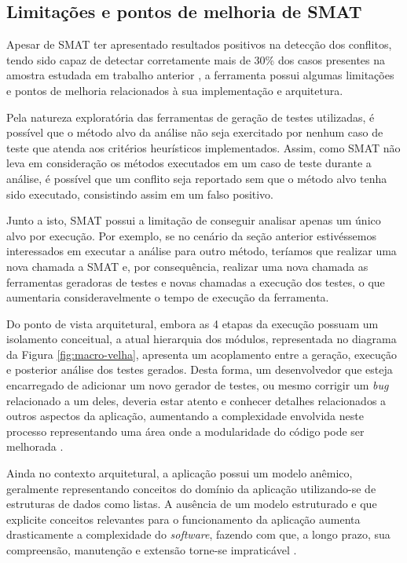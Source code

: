 \documentclass[12pt]{article}
\begin{document}
\subsection{Limitações e pontos de melhoria de SMAT}
Apesar de SMAT ter apresentado resultados positivos na detecção dos conflitos, tendo sido capaz de detectar corretamente mais de 30\% dos casos presentes na amostra estudada em trabalho anterior \cite{leuson:icsme}, a ferramenta possui algumas limitações e pontos de melhoria relacionados à sua implementação e arquitetura.

Pela natureza exploratória das ferramentas de geração de testes utilizadas, é possível que o método alvo da análise não seja exercitado por nenhum caso de teste que atenda aos critérios heurísticos implementados. Assim, como SMAT não leva em consideração os métodos executados em um caso de teste durante a análise, é possível que um conflito seja reportado sem que o método alvo tenha sido executado, consistindo assim em um falso positivo.

Junto a isto, SMAT possui a limitação de conseguir analisar apenas um único alvo por execução. Por exemplo, se no cenário da seção anterior estivéssemos interessados em executar a análise para outro método, teríamos que realizar uma nova chamada a SMAT e, por consequência, realizar uma nova chamada as ferramentas geradoras de testes e novas chamadas a execução dos testes, o que aumentaria consideravelmente o tempo de execução da ferramenta.

Do ponto de vista arquitetural, embora as 4 etapas da execução possuam um isolamento conceitual, a atual hierarquia dos módulos, representada no diagrama da Figura \ref{fig:macro-velha}, apresenta um acoplamento entre a geração, execução e posterior análise dos testes gerados. Desta forma, um desenvolvedor que esteja encarregado de adicionar um novo gerador de testes, ou mesmo corrigir um \textit{bug} relacionado a um deles, deveria estar atento e conhecer detalhes relacionados a outros aspectos da aplicação, aumentando a complexidade envolvida neste processo representando uma área onde a modularidade do código pode ser melhorada \cite{ousterhout2018philosophy}.

Ainda no contexto arquitetural, a aplicação possui um modelo anêmico, geralmente representando conceitos do domínio da aplicação utilizando-se de estruturas de dados como listas. A ausência de um modelo estruturado e que explicite conceitos relevantes para o funcionamento da aplicação aumenta drasticamente a complexidade do \textit{software}, fazendo com que, a longo prazo, sua compreensão, manutenção e extensão torne-se impraticável \cite{ddd}.
\end{document}
